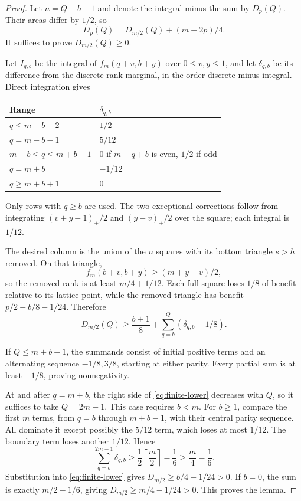 \documentclass[11pt]{article}
\theoremstyle{remark}\newtheorem{remark}[theorem]{Remark}
\begin{document}
\begin{proof}
Let $n=Q-b+1$ and denote the integral minus the sum by $D_p(Q)$. Their areas differ by $1/2$, so
\[
 D_p(Q)=D_{m/2}(Q)+(m-2p)/4.
\]
It suffices to prove $D_{m/2}(Q)\ge0$.

Let $I_{q,b}$ be the integral of $f_m(q+v,b+y)$ over $0\le v,y\le1$, and let $\delta_{q,b}$ be its difference from the discrete rank marginal, in the order discrete minus integral. Direct integration gives
\begin{center}
\begin{tabular}{@{}ll@{}}\toprule
Range & $\delta_{q,b}$\\\midrule
$q\le m-b-2$ & $1/2$\\
$q=m-b-1$ & $5/12$\\
$m-b\le q\le m+b-1$ & $0$ if $m-q+b$ is even, $1/2$ if odd\\
$q=m+b$ & $-1/12$\\
$q\ge m+b+1$ & $0$\\\bottomrule
\end{tabular}
\end{center}
Only rows with $q\ge b$ are used. The two exceptional corrections follow from integrating $(v+y-1)_+/2$ and $(y-v)_+/2$ over the square; each integral is $1/12$.

The desired column is the union of the $n$ squares with its bottom triangle $s>h$ removed. On that triangle,
\[
 f_m(b+v,b+y)\ge(m+y-v)/2,
\]
so the removed rank is at least $m/4+1/12$. Each full square loses $1/8$ of benefit relative to its lattice point, while the removed triangle has benefit $p/2-b/8-1/24$. Therefore
\begin{equation}\label{eq:finite-lower}
 D_{m/2}(Q)\ge\frac{b+1}{8}
       +\sum_{q=b}^Q(\delta_{q,b}-1/8).
\end{equation}

If $Q\le m+b-1$, the summands consist of initial positive terms and an alternating sequence $-1/8,3/8$, starting at either parity. Every partial sum is at least $-1/8$, proving nonnegativity.

At and after $q=m+b$, the right side of \eqref{eq:finite-lower} decreases with $Q$, so it suffices to take $Q=2m-1$. This case requires $b<m$. For $b\ge1$, compare the first $m$ terms, from $q=b$ through $m+b-1$, with their central parity sequence. All dominate it except possibly the $5/12$ term, which loses at most $1/12$. The boundary term loses another $1/12$. Hence
\[
 \sum_{q=b}^{2m-1}\delta_{q,b}
 \ge\frac12\left\lceil\frac m2\right\rceil-\frac16
 \ge\frac m4-\frac16.
\]
Substitution into \eqref{eq:finite-lower} gives $D_{m/2}\ge b/4-1/24>0$. If $b=0$, the sum is exactly $m/2-1/6$, giving $D_{m/2}\ge m/4-1/24>0$. This proves the lemma.
\end{proof}
\end{document}

